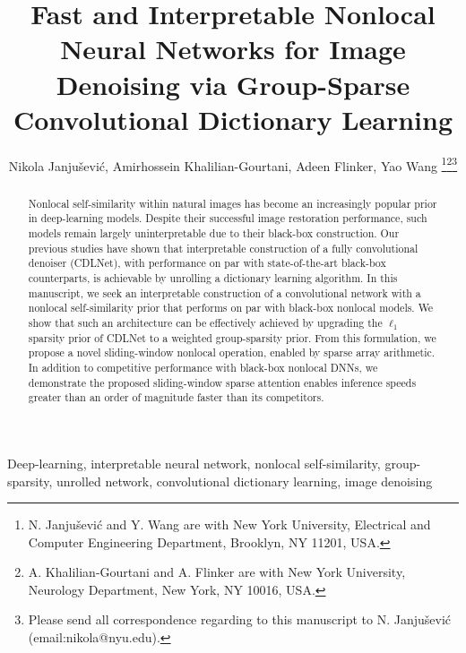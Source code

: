 \documentclass[lettersize,journal]{IEEEtran}
\newcommand{\soa}{state-of-the-art }
\begin{document}
\title{Fast and Interpretable Nonlocal Neural Networks for Image Denoising via Group-Sparse Convolutional Dictionary Learning}

\author{Nikola Janju\v{s}evi\'{c}, Amirhossein Khalilian-Gourtani, Adeen Flinker, Yao Wang 
\thanks{N. Janju\v{s}evi\'{c} and Y. Wang are with New York University, Electrical and Computer Engineering Department, Brooklyn, NY 11201, USA.}\thanks{A. Khalilian-Gourtani and A. Flinker are with New York University, Neurology Department, New York, NY 10016, USA.}\thanks{Please send all correspondence regarding to this manuscript to N. Janju\v{s}evi\'{c} (email:nikola@nyu.edu).}}



\maketitle

\begin{abstract}
    Nonlocal self-similarity within natural images has become an
    increasingly popular prior in deep-learning models. Despite their successful
    image restoration performance, such models remain largely
    uninterpretable due to their black-box construction. 
    Our previous studies have shown that interpretable
    construction of a fully convolutional denoiser (CDLNet), with performance on par with \soa
    black-box counterparts, is achievable by unrolling a dictionary learning algorithm.
    In this manuscript, we seek an interpretable construction of a convolutional
    network with a nonlocal self-similarity prior that performs on par with
    black-box nonlocal models. We show that such an architecture can be
    effectively achieved by upgrading the $\ell_1$ sparsity prior of 
    CDLNet to a weighted group-sparsity prior. From this
    formulation, we propose a novel sliding-window nonlocal operation, enabled
    by sparse array arithmetic. In addition to competitive performance with black-box
    nonlocal DNNs, we demonstrate the proposed sliding-window sparse attention
    enables inference speeds greater than an order of magnitude faster than its competitors.
\end{abstract}

\begin{IEEEkeywords}
Deep-learning, interpretable neural network, nonlocal self-similarity,
group-sparsity, unrolled network, convolutional dictionary learning, image denoising
\end{IEEEkeywords}
\end{document}
